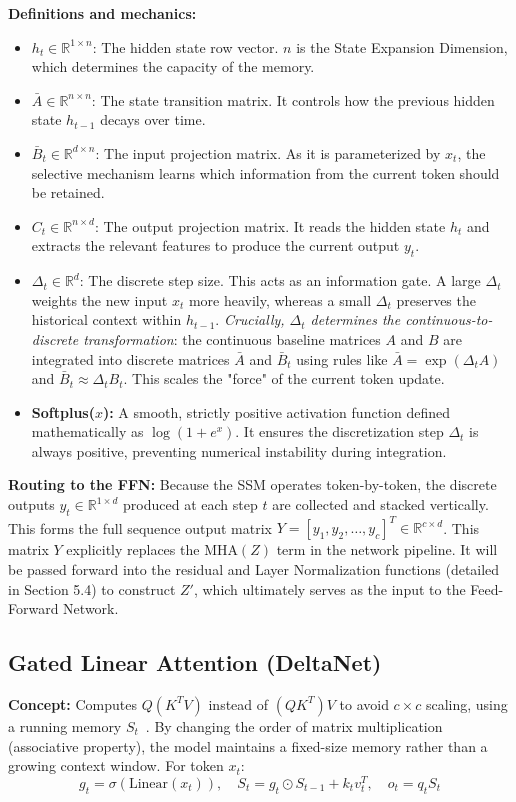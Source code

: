 \documentclass[11pt]{article}
\begin{document}
	\textbf{Definitions and mechanics:}
	\begin{itemize}
		\item $h_t \in \mathbb{R}^{1 \times n}$: The hidden state row vector.
		$n$ is the State Expansion Dimension, which determines the capacity of the memory.
		\item $\bar{A} \in \mathbb{R}^{n \times n}$: The state transition matrix.
		It controls how the previous hidden state $h_{t-1}$ decays over time.
		\item $\bar{B}_t \in \mathbb{R}^{d \times n}$: The input projection matrix.
		As it is parameterized by $x_t$, the selective mechanism learns which information from the current token should be retained.
		\item $C_t \in \mathbb{R}^{n \times d}$: The output projection matrix.
		It reads the hidden state $h_t$ and extracts the relevant features to produce the current output $y_t$.
		\item $\Delta_t \in \mathbb{R}^d$: The discrete step size. This acts as an information gate.
		A large $\Delta_t$ weights the new input $x_t$ more heavily, whereas a small $\Delta_t$ preserves the historical context within $h_{t-1}$. 
		\textit{Crucially, $\Delta_t$ determines the continuous-to-discrete transformation}: the continuous baseline matrices $A$ and $B$ are integrated into discrete matrices $\bar{A}$ and $\bar{B}_t$ using rules like $\bar{A} = \exp(\Delta_t A)$ and $\bar{B}_t \approx \Delta_t B_t$. This scales the "force" of the current token update.
		\item \textbf{Softplus($x$):} A smooth, strictly positive activation function defined mathematically as $\log(1 + e^x)$.
		It ensures the discretization step $\Delta_t$ is always positive, preventing numerical instability during integration.
	\end{itemize}
	
	\textbf{Routing to the FFN:}
	Because the SSM operates token-by-token, the discrete outputs $y_t \in \mathbb{R}^{1 \times d}$ produced at each step $t$ are collected and stacked vertically. This forms the full sequence output matrix $Y = [y_1, y_2, \dots, y_c]^T \in \mathbb{R}^{c \times d}$. This matrix $Y$ explicitly replaces the $\text{MHA}(Z)$ term in the network pipeline. It will be passed forward into the residual and Layer Normalization functions (detailed in Section 5.4) to construct $Z'$, which ultimately serves as the input to the Feed-Forward Network.
	
	\subsection{Gated Linear Attention (DeltaNet)}
	\textbf{Concept:} Computes $Q (K^T V)$ instead of $(Q K^T) V$ to avoid $c \times c$ scaling, using a running memory $S_t$~\cite{yang2024gated}.
	By changing the order of matrix multiplication (associative property), the model maintains a fixed-size memory rather than a growing context window.
	For token $x_t$:
	\begin{equation}
		g_t = \sigma(\text{Linear}(x_t)), \quad S_t = g_t \odot S_{t-1} + k_t v_t^T, \quad o_t = q_t S_t
	\end{equation}
	
\end{document}
